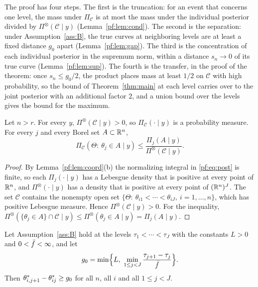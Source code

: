 The proof has four steps. The first is the truncation: for an event that concerns one level, the mass under $\Pi_{\mathcal C}$ is at most the mass under the individual posterior divided by $\Pi^{\otimes}(\mathcal C\mid y)$ (Lemma~\ref{pf:lem:cond}). The second is the separation: under Assumption~\ref{ass:B}, the true curves at neighboring levels are at least a fixed distance $g_0$ apart (Lemma~\ref{pf:lem:gap}). The third is the concentration of each individual posterior in the supremum norm, within a distance $s_n\to0$ of its true curve (Lemma~\ref{pf:lem:sup}). The fourth is the transfer, in the proof of the theorem: once $s_n\le g_0/2$, the product places mass at least $1/2$ on $\mathcal C$ with high probability, so the bound of Theorem~\ref{thm:main} at each level carries over to the joint posterior with an additional factor $2$, and a union bound over the levels gives the bound for the maximum.

\begin{lemma}[conditioning]\label{pf:lem:cond}
Let $n>r$. For every $y$, $\Pi^{\otimes}(\mathcal C\mid y)>0$, so $\Pi_{\mathcal C}(\cdot\mid y)$ is a probability measure. For every $j$ and every Borel set $A\subset\mathbb{R}^n$,
\[
\Pi_{\mathcal C}(\Theta:\ \theta_j\in A\mid y)\le\frac{\Pi_j(A\mid y)}{\Pi^{\otimes}(\mathcal C\mid y)} .
\]
\end{lemma}

\begin{proof}
By Lemma~\ref{pf:lem:coord}(b) the normalizing integral in \eqref{pf:eq:post} is finite, so each $\Pi_j(\cdot\mid y)$ has a Lebesgue density that is positive at every point of $\mathbb{R}^n$, and $\Pi^{\otimes}(\cdot\mid y)$ has a density that is positive at every point of $(\mathbb{R}^n)^J$. The set $\mathcal C$ contains the nonempty open set $\{\Theta:\ \theta_{i1}<\cdots<\theta_{iJ},\ i=1,\dots,n\}$, which has positive Lebesgue measure. Hence $\Pi^{\otimes}(\mathcal C\mid y)>0$. For the inequality, $\Pi^{\otimes}(\{\theta_j\in A\}\cap\mathcal C\mid y)\le\Pi^{\otimes}(\theta_j\in A\mid y)=\Pi_j(A\mid y)$.
\end{proof}

\begin{lemma}[separation]\label{pf:lem:gap}
Let Assumption~\ref{ass:B} hold at the levels $\tau_1<\cdots<\tau_J$ with the constants $L>0$ and $0<\bar f<\infty$, and let
\[
g_0=\min\Bigl\{L,\ \min_{1\le j<J}\frac{\tau_{j+1}-\tau_j}{\bar f}\Bigr\}.
\]
Then $\theta^{*}_{i,j+1}-\theta^{*}_{ij}\ge g_0$ for all $n$, all $i$ and all $1\le j<J$.
\end{lemma}

